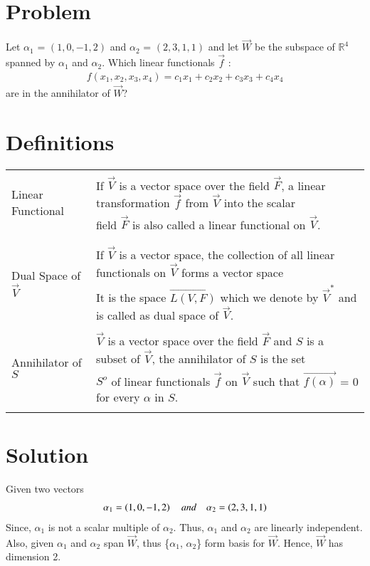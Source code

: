 \documentclass[journal,12pt,twocolumn]{IEEEtran}
\newcommand\myemptypage{
	\null
	\thispagestyle{empty}
	\addtocounter{page}{-1}
	\newpage
}
\begin{document}
\section{Problem}
Let $\alpha_1$ = $(1, 0,-1, 2)$ and $\alpha_2$ = $(2,3, 1,1)$ and let $\vec{W}$ be the subspace of $\mathbb{R}^4$ spanned by $\alpha_1$ and $\alpha_2$. Which linear functionals $\vec{f}$ :
\begin{align}
f(x_1,x_2,x_3,x_4) = c_1x_1 + c_2x_2 + c_3x_3 + c_4x_4
\end{align}
are in the annihilator of $\vec{W}$?
\section{Definitions}
\begin{table}[hp]
	\begin{tabular}{|l|l|}
		\hline
		\multirow{3}{*}{Linear Functional} & \\
		& If $\vec{V}$ is a vector space over the field $\vec{F}$, a linear transformation $\vec{f}$ from $\vec{V}$
		into the scalar \\
		& field $\vec{F}$ is also called a linear functional on $\vec{V}$. \\
		& \\
		\hline
		\multirow{3}{*}{Dual Space of $\vec{V}$} & \\
		& If $\vec{V}$ is a vector space, the collection of all linear functionals on $\vec{V}$ forms a vector space\\
		& It is the space $\vec{L(V, F)}$ which we denote by $\vec{V}^{*}$ and is called as dual space of $\vec{V}$.\\
		\hline
		\multirow{3}{*}{Annihilator of $S$} & \\
		& $\vec{V}$ is a vector space over the field $\vec{F}$ and $S$ is a subset of $\vec{V}$, the annihilator of $S$ is the set \\
		& $S^{o}$ of linear functionals $\vec{f}$ on $\vec{V}$ such that $\vec{f(\alpha)}$ = 0 for every $\alpha$ in $S$. \\
		& \\
		\hline
	\end{tabular}
\end{table}
\section{Solution}
\pagebreak
\myemptypage
Given two vectors 
\begin{align}
\alpha_1 = \left(1,0,-1,2\right) \quad and \quad \alpha_2 = \left(2,3,1,1\right)
\end{align}
Since, $\alpha_1$ is not a scalar multiple of $\alpha_2$. Thus, $\alpha_1$ and $\alpha_2$ are linearly independent. Also, given $\alpha_1$ and $\alpha_2$ span $\vec{W}$, thus \{$\alpha_1$, $\alpha_2$\} form basis for $\vec{W}$. Hence, $\vec{W}$ has dimension 2.
\end{document}
